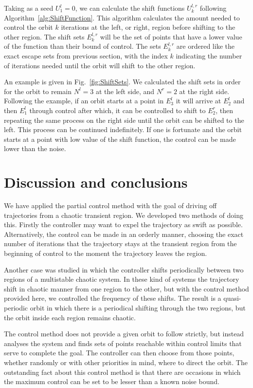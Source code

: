 Taking as a seed $U^l_1 = 0$,  we can calculate the shift functions $U^{l,r}_k$ following Algorithm~\ref{alg:ShiftFunction}. This algorithm calculates the amount needed to control the orbit $k$ iterations at the left, or right, region before shifting to the other region. The shift sets $E^{l,r}_k$ will be the set of points that have a lower value of the function than their bound of control. The sets $E^{l,r}_k$ are ordered like the exact escape sets from previous section, with the index $k$ indicating the number of iterations needed until the orbit will shift to the other region. 

An example is given in Fig.~\ref{fig:ShiftSets}. We calculated the shift sets in order for the orbit to remain $N^l = 3$ at the left side, and $N^r = 2$ at the right side. Following the example, if an orbit starts at a point in $E^l_3$ it will arrive at $E^l_2$ and then $E^l_1$ through control after which, it can be controlled to shift to $E^r_2$, then repeating the same process on the right side until the orbit can be shifted to the left. This process can be continued indefinitely. If one is fortunate and the orbit starts at a point with low value of the shift function, the control can be made lower than the noise.


\section{Discussion and conclusions}

We have applied the partial control method with the goal of driving off trajectories from a chaotic transient region. We developed two methods of doing this. Firstly the controller may want to expel the trajectory as swift as possible. Alternatively, the control can be made in an orderly manner, choosing the exact number of iterations that the trajectory stays at the transient region from the beginning of control to the moment the trajectory leaves the region.

Another case was studied in which the controller shifts periodically between two regions of a multistable chaotic system. In these kind of systems the trajectory shift in chaotic manner from one region to the other, but with the control method provided here, we controlled the frequency of these shifts. The result is a quasi-periodic orbit in which there is a periodical shifting through the two regions, but the orbit inside each region remains chaotic.

The control method does not provide a given orbit to follow strictly, but instead analyses the system and finds sets of points reachable within control limits that serve to complete the goal. The controller can then choose from those points, whether randomly or with other priorities in mind, where to direct the orbit. The outstanding fact about this control method is that there are occasions in which the maximum control can be set to be lesser than a known noise bound.

